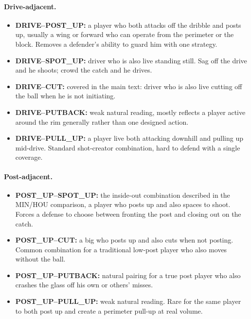 \documentclass[11pt]{article}
\begin{document}
\paragraph*{Drive-adjacent.}
\begin{itemize}[leftmargin=1.4em,itemsep=0.2em]
 \item \textbf{DRIVE--POST\_UP:} a player who both attacks off the dribble and posts up,
 usually a wing or forward who can operate from the perimeter or the block. Removes a
 defender's ability to guard him with one strategy.
 \item \textbf{DRIVE--SPOT\_UP:} driver who is also live standing still. Sag off the drive
 and he shoots; crowd the catch and he drives.
 \item \textbf{DRIVE--CUT:} covered in the main text: driver who is also live cutting off the
 ball when he is not initiating.
 \item \textbf{DRIVE--PUTBACK:} weak natural reading, mostly reflects a player active around
 the rim generally rather than one designed action.
 \item \textbf{DRIVE--PULL\_UP:} a player live both attacking downhill and pulling up
 mid-drive. Standard shot-creator combination, hard to defend with a single coverage.
\end{itemize}

\paragraph*{Post-adjacent.}
\begin{itemize}[leftmargin=1.4em,itemsep=0.2em]
 \item \textbf{POST\_UP--SPOT\_UP:} the inside-out combination described in the MIN/HOU
 comparison, a player who posts up and also spaces to shoot. Forces a defense to choose
 between fronting the post and closing out on the catch.
 \item \textbf{POST\_UP--CUT:} a big who posts up and also cuts when not posting. Common
 combination for a traditional low-post player who also moves without the ball.
 \item \textbf{POST\_UP--PUTBACK:} natural pairing for a true post player who also crashes
 the glass off his own or others' misses.
 \item \textbf{POST\_UP--PULL\_UP:} weak natural reading. Rare for the same player to both
 post up and create a perimeter pull-up at real volume.
\end{itemize}
\end{document}
